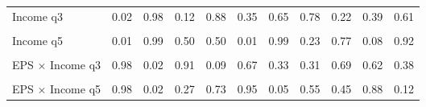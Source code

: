 \begin{table}
\begin{tabular}[t]{lrrrrrrrrrr}
Income q3 & 0.02 & 0.98 & 0.12 & 0.88 & 0.35 & 0.65 & 0.78 & 0.22 & 0.39 & 0.61\\
\cellcolor{gray!10}{Income q4} & \cellcolor{gray!10}{0.01} & \cellcolor{gray!10}{0.99} & \cellcolor{gray!10}{0.05} & \cellcolor{gray!10}{0.95} & \cellcolor{gray!10}{0.16} & \cellcolor{gray!10}{0.84} & \cellcolor{gray!10}{0.70} & \cellcolor{gray!10}{0.30} & \cellcolor{gray!10}{0.53} & \cellcolor{gray!10}{0.47}\\
Income q5 & 0.01 & 0.99 & 0.50 & 0.50 & 0.01 & 0.99 & 0.23 & 0.77 & 0.08 & 0.92\\
\cellcolor{gray!10}{EPS × Income q2} & \cellcolor{gray!10}{0.60} & \cellcolor{gray!10}{0.40} & \cellcolor{gray!10}{0.37} & \cellcolor{gray!10}{0.63} & \cellcolor{gray!10}{0.82} & \cellcolor{gray!10}{0.18} & \cellcolor{gray!10}{0.26} & \cellcolor{gray!10}{0.74} & \cellcolor{gray!10}{0.46} & \cellcolor{gray!10}{0.54}\\
EPS × Income q3 & 0.98 & 0.02 & 0.91 & 0.09 & 0.67 & 0.33 & 0.31 & 0.69 & 0.62 & 0.38\\
\cellcolor{gray!10}{EPS × Income q4} & \cellcolor{gray!10}{0.98} & \cellcolor{gray!10}{0.02} & \cellcolor{gray!10}{0.87} & \cellcolor{gray!10}{0.13} & \cellcolor{gray!10}{0.67} & \cellcolor{gray!10}{0.33} & \cellcolor{gray!10}{0.16} & \cellcolor{gray!10}{0.84} & \cellcolor{gray!10}{0.43} & \cellcolor{gray!10}{0.57}\\
EPS × Income q5 & 0.98 & 0.02 & 0.27 & 0.73 & 0.95 & 0.05 & 0.55 & 0.45 & 0.88 & 0.12\\
\bottomrule
\end{tabular}
\end{table}
